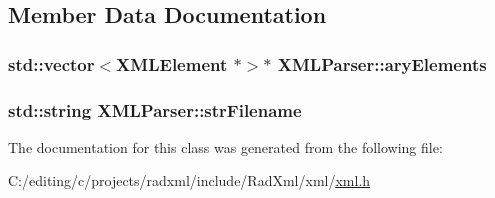 \subsection{Member Data Documentation}
\hypertarget{class_x_m_l_parser_a15b918c0da7ca92c9c6b1bc2942e06f1}{
\subsubsection[{ary\-Elements}]{\setlength{\rightskip}{0pt plus 5cm}std\-::vector$<${\bf X\-M\-L\-Element} $\ast$$>$$\ast$ X\-M\-L\-Parser\-::ary\-Elements\hspace{0.3cm}{\ttfamily [protected]}}}\label{class_x_m_l_parser_a15b918c0da7ca92c9c6b1bc2942e06f1}
\hypertarget{class_x_m_l_parser_a7eb60e2a223b32c561bf5ca759ac3786}{
\subsubsection[{str\-Filename}]{\setlength{\rightskip}{0pt plus 5cm}std\-::string X\-M\-L\-Parser\-::str\-Filename\hspace{0.3cm}{\ttfamily [protected]}}}\label{class_x_m_l_parser_a7eb60e2a223b32c561bf5ca759ac3786}


The documentation for this class was generated from the following file\-:\begin{DoxyCompactItemize}
\item 
C\-:/editing/c/projects/radxml/include/\-Rad\-Xml/xml/\hyperlink{xml_8h}{xml.\-h}\end{DoxyCompactItemize}
